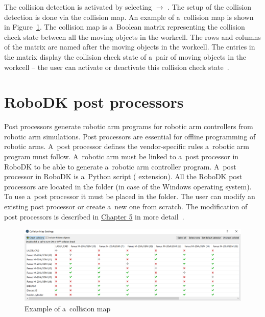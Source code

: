 The collision detection is activated by selecting  $\rightarrow$ . The setup of the collision detection is done via the collision map. An example of a~collision map is shown in Figure~\ref{fig:collisionmap}. The collision map is a~Boolean matrix representing the collision check state between all the moving objects in the workcell. The rows and columns of the matrix are named after the moving objects in the workcell. The entries in the matrix display the collision check state of a~pair of moving objects in the workcell -- the user can activate or deactivate this collision check state~\cite{robodkcollision}.

\section{RoboDK post processors}

Post processors generate robotic arm programs for robotic arm controllers from robotic arm simulations. Post processors are essential for offline programming of robotic arms. A~post processor defines the vendor-specific rules a~robotic arm program must follow. A~robotic arm must be linked to a~post processor in RoboDK to be able to generate a~robotic arm controller program. A~post processor in RoboDK is a~Python script ( extension). All the RoboDK post processors are located in the
 folder (in case of the Windows operating system).  To use a~post processor it must be placed in the  folder. The user can modify an existing post processor or create a~new one from scratch. The modification of post processors is described in \hyperref[chap:implementation]{Chapter 5} in more detail~\cite{robodkposts}. 

\begin{figure}[h]
    \centering
    \includegraphics[width=1.0\linewidth]{img/collision_map.PNG}
    \caption{Example of a~collision map}
    \label{fig:collisionmap}
\end{figure}


